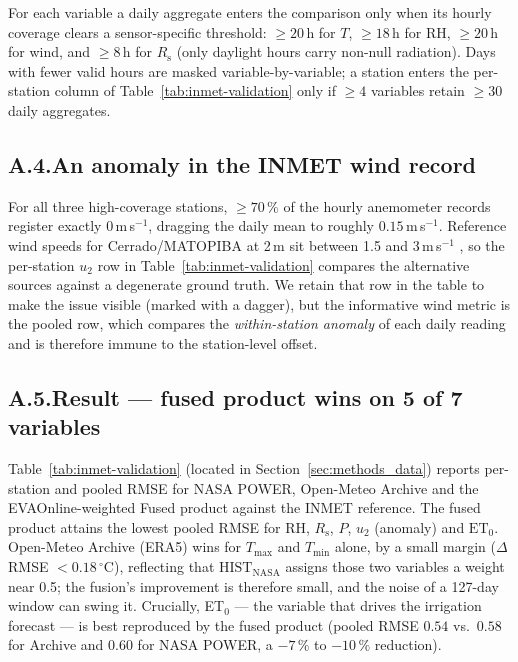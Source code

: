 For each variable a daily aggregate enters the comparison only when
its hourly coverage clears a sensor-specific threshold:
$\geq 20$\,h for $T$, $\geq 18$\,h for RH, $\geq 20$\,h for wind, and
$\geq 8$\,h for $R_\mathrm{s}$ (only daylight hours carry non-null
radiation). Days with fewer valid hours are masked variable-by-variable;
a station enters the per-station column of
Table~\ref{tab:inmet-validation} only if $\geq 4$ variables retain
$\geq 30$ daily aggregates.

\subsection*{A.4.\quad An anomaly in the INMET wind record}

For all three high-coverage stations, $\geq 70\,\%$ of the hourly
anemometer records register exactly $0$\,m\,s$^{-1}$, dragging the
daily mean to roughly $0.15$\,m\,s$^{-1}$. Reference wind speeds for
Cerrado/MATOPIBA at 2\,m sit between 1.5 and 3\,m\,s$^{-1}$
\citep{Allen1998}, so the per-station $u_2$ row in
Table~\ref{tab:inmet-validation} compares the alternative sources
against a degenerate ground truth. We retain that row in the table
to make the issue visible (marked with a dagger), but the
informative wind metric is the pooled row, which compares the
\emph{within-station anomaly} of each daily reading and is therefore
immune to the station-level offset.

\subsection*{A.5.\quad Result --- fused product wins on 5 of 7 variables}

Table~\ref{tab:inmet-validation} (located in
Section~\ref{sec:methods_data}) reports per-station and pooled RMSE for
NASA POWER, Open-Meteo Archive and the EVAOnline-weighted Fused
product against the INMET reference. The fused product attains the
lowest pooled RMSE for $\mathrm{RH}$, $R_\mathrm{s}$, $P$, $u_2$
(anomaly) and $\mathrm{ET}_0$. Open-Meteo Archive (ERA5) wins for
$T_\mathrm{max}$ and $T_\mathrm{min}$ alone, by a small margin
($\Delta$RMSE $< 0.18\,^\circ$C), reflecting that
$\mathrm{HIST}_\mathrm{NASA}$ assigns those two variables a weight
near 0.5; the fusion's improvement is therefore small, and the noise
of a 127-day window can swing it. Crucially, ET$_0$ --- the variable
that drives the irrigation forecast --- is best reproduced by the
fused product (pooled RMSE $0.54$ vs.\ $0.58$ for Archive and
$0.60$ for NASA POWER, a $-7\,\%$ to $-10\,\%$ reduction).

